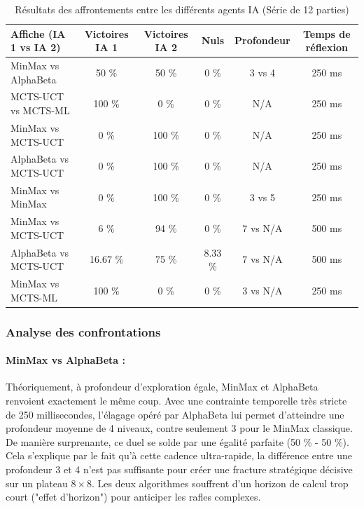 \documentclass[a4paper]{article}
\begin{document}
\begin{table}[!ht]
    \centering
    \caption{Résultats des affrontements entre les différents agents IA (Série de 12 parties)}
    \label{tab:benchmark-ia}
    \renewcommand{\arraystretch}{1.3}
    \begin{tabular}{|l|c|c|c|c|c|}
        \hline
      \textbf{Affiche (IA 1 vs IA 2)} & \textbf{Victoires IA 1} & \textbf{Victoires IA 2} & \textbf{Nuls} & \textbf{Profondeur} & \textbf{Temps de réflexion} \\ \hline
      MinMax vs AlphaBeta & 50 \% & 50 \% & 0 \% & 3 vs 4  & 250 ms \\ \hline
      MCTS-UCT vs MCTS-ML & 100 \% & 0 \% & 0 \% & N/A & 250 ms \\ \hline
      MinMax vs MCTS-UCT & 0 \% & 100 \% & 0 \% & N/A & 250 ms \\ \hline
      AlphaBeta vs MCTS-UCT & 0 \% & 100 \% & 0 \% & N/A & 250 ms \\ \hline
      MinMax vs MinMax & 0 \% & 100 \% & 0 \% & 3 vs 5  & 250 ms \\ \hline
      MinMax vs MCTS-UCT & 6 \% & 94 \% & 0 \% & 7 vs N/A  & 500 ms \\ \hline
      AlphaBeta vs MCTS-UCT & 16.67 \% & 75 \% & 8.33 \% & 7 vs N/A  & 500 ms \\ \hline
      MinMax vs MCTS-ML & 100 \% & 0 \% & 0 \% & 3 vs N/A  & 250 ms \\ \hline
    \end{tabular}
\end{table}

\subsubsection{Analyse des confrontations}

\paragraph{MinMax vs AlphaBeta :}
Théoriquement, à profondeur d'exploration égale, MinMax et AlphaBeta renvoient exactement le même coup. Avec une contrainte 
temporelle très stricte de 250 millisecondes, l'élagage opéré par AlphaBeta lui permet d'atteindre une profondeur moyenne de 
4 niveaux, contre seulement 3 pour le MinMax classique. De manière surprenante, ce duel se solde par une égalité parfaite (50 \% - 50 \%). 
Cela s'explique par le fait qu'à cette cadence ultra-rapide, la différence entre une profondeur 3 et 4 n'est pas suffisante pour créer une 
fracture stratégique décisive sur un plateau $8 \times 8$. Les deux algorithmes souffrent d'un horizon de calcul trop court ("effet d'horizon") 
pour anticiper les rafles complexes.
\end{document}
